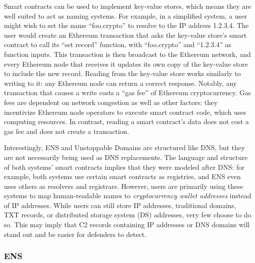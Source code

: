 Smart contracts can be used to implement key-value stores, which means they are 
well suited to act as naming 
systems. For example, in a simplified system, a user might wish to set the name 
``foo.crypto'' to resolve to the IP address 1.2.3.4. The user would create an 
Ethereum transaction that asks the key-value store's smart 
contract 
to call its ``set record'' function, with ``foo.crypto'' and 
``1.2.3.4'' as function inputs. 
This transaction is then broadcast to the Ethereum network, 
and every Ethereum 
node that receives it updates its own copy of the key-value store to include 
the new record. Reading from the key-value store works similarly to writing to 
it: any Ethereum node can return a correct response. 
Notably, any transaction that causes a write costs a ``gas 
fee'' of Ethereum cryptocurrency. Gas fees are 
dependent on network 
congestion as well as other factors: they incentivize 
Ethereum node operators to execute smart contract code, which 
uses computing resources. In contrast, reading a 
smart contract's data does not cost a gas fee and does not 
create a transaction.

Interestingly, ENS and Unstoppable Domains are structured 
like DNS, but they are not necessarily being used as DNS 
replacements. The language and structure of both systems' 
smart 
contracts implies that they were 
modeled after DNS: for example, both systems use certain 
smart contracts 
as registries, and ENS even uses others as resolvers and 
registrars. However, users are primarily using these systems 
to map human-readable names to \emph{cryptocurrency wallet 
addresses} 
instead of IP addresses. While users can still store IP 
addresses, traditional domains, TXT records, or distributed 
storage system (DS) addresses, 
very few choose to do so. This may imply that C2 records containing IP 
addresses or DNS domains will stand out and be easier for defenders to detect.

\subsubsection{ENS}

